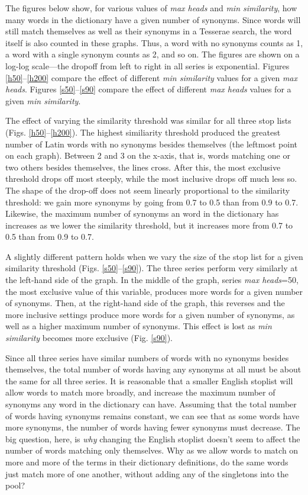 \documentclass[]{article}
\begin{document}
 	The figures below show, for various values of \emph{max heads} and \emph{min similarity}, how many words in the dictionary have a given number of synonyms.  Since words will still match themselves as well as their synonyms in a Tesserae search, the word itself is also counted in these graphs.  Thus, a word with no synonyms counts as 1, a word with a single synonym counts as 2, and so on.  The figures are shown on a log-log scale—the dropoff from left to right in all series is exponential.  Figures \ref{h50}–\ref{h200} compare the effect of different \emph{min similarity} values for a given \emph{max heads}.  Figures \ref{s50}–\ref{s90} compare the effect of different \emph{max heads} values for a given \emph{min similarity}.
	
	The effect of varying the similarity threshold was similar for all three stop lists (Figs. \ref{h50}–\ref{h200}).  The highest similiarity threshold produced the greatest number of Latin words with no synonyms besides themselves (the leftmost point on each graph).  Between 2 and 3 on the x-axis, that is, words matching one or two others besides themselves, the lines cross. After this, the most exclusive threshold drops off most steeply, while the most inclusive drops off much less so.  The shape of the drop-off does not seem linearly proportional to the similarity threshold: we gain more synonyms by going from 0.7 to 0.5 than from 0.9 to 0.7.  Likewise, the maximum number of synonyms an word in the dictionary has increases as we lower the similarity threshold, but it increases more from 0.7 to 0.5 than from 0.9 to 0.7.
	
	A slightly different pattern holds when we vary the size of the stop list for a given similarity threshold (Figs. \ref{s50}–\ref{s90}).  The three series perform very similarly at the left-hand side of the graph.  In the middle of the graph, series \emph{max heads}=50, the most exclusive value of this variable, produces more words for a given number of synonyms.  Then, at the right-hand side of the graph, this reverses and the more inclusive settings produce more words for a given number of synonyms, as well as a higher maximum number of synonyms.  This effect is lost as \emph{min similarity} becomes more exclusive (Fig. \ref{s90}).
	
	Since all three series have similar numbers of words with no synonyms besides themselves, the total number of words having any synonyms at all must be about the same for all three series.  It is reasonable that a smaller English stoplist will allow words to match more broadly, and increase the maximum number of synonyms any word in the dictionary can have.  Assuming that the total number of words having synonyms remains constant, we can see that as some words have more synonyms, the number of words having fewer synonyms must decrease.  The big question, here, is \emph{why} changing the English stoplist doesn't seem to affect the number of words matching only themselves.  Why as we allow words to match on more and more of the terms in their dictionary definitions, do the same words just match more of one another, without adding any of the singletons into the pool?
	
\end{document}

